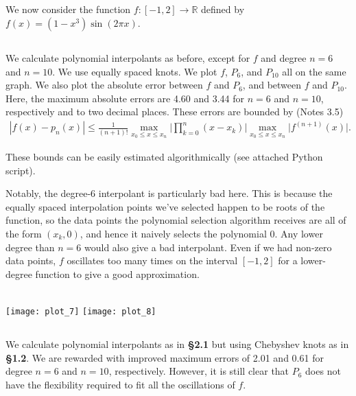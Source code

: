 \documentclass[11pt, oneside]{article}
\begin{document}
We now consider the function $f: [-1, 2] \rightarrow \mathbb{R}$ defined by
$f(x) = (1 - x^3)\sin(2 \pi x)$.

\subsection{}

We calculate polynomial interpolants as before, except for $f$ and degree $n = 6$ and $n = 10$. We use equally spaced knots. We plot $f$, $P_6$, and $P_{10}$ all on the same graph. We also plot the absolute error between $f$ and $P_6$, and between $f$ and $P_10$. Here, the maximum absolute errors are 4.60 and 3.44 for $n = 6$ and $n = 10$, respectively and to two decimal places. These errors are bounded by (Notes 3.5)
\begin{eqnarray*}
|f(x) - p_n(x)| \leq \frac{1}{(n + 1)!} 
\max_{x_0 \leq x \leq x_n} \bigl|\prod_{k = 0}^n (x - x_k) \bigr|
\max_{x_0 \leq x \leq x_n} \bigl| f^{(n + 1)}(x)\bigr| . 
\end{eqnarray*}

These bounds can be easily estimated algorithmically (see attached Python script). 

Notably, the degree-6 interpolant is particularly bad here. This is because the equally spaced interpolation points we've selected happen to be roots of the function, so the data points the polynomial selection algorithm receives are all of the form $(x_k, 0)$, and hence it naively selects the polynomial $0$. Any lower degree than $n = 6$ would also give a bad interpolant. Even if we had non-zero data points, $f$ oscillates too many times on the interval $[-1,2]$ for a lower-degree function to give a good approximation. 

~\\

\texttt{[image: plot\_7]}
\texttt{[image: plot\_8]}

\subsection{}

We calculate polynomial interpolants as in \textbf{\S2.1} but using Chebyshev knots as in \textbf{\S1.2}. We are rewarded with improved maximum errors of 2.01 and 0.61 for degree $n = 6$ and $n = 10$, respectively. However, it is still clear that $P_6$ does not have the flexibility required to fit all the oscillations of $f$. 

~\\
\end{document}
